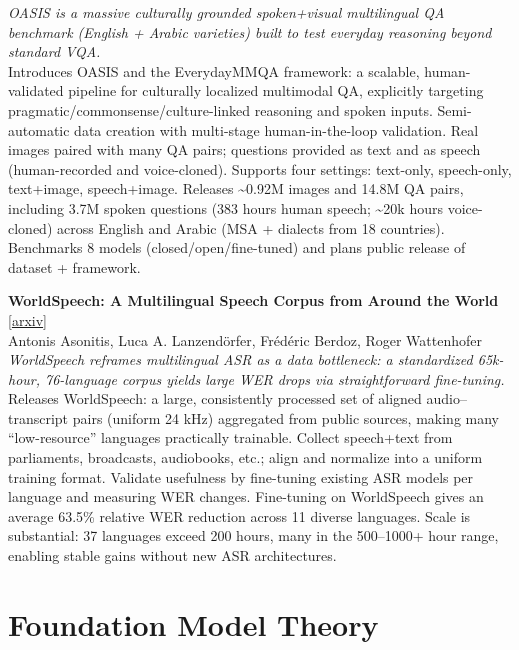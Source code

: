 \documentclass[12pt,letterpaper]{article}
\begin{document}
{\small\textit{OASIS is a massive culturally grounded spoken+visual multilingual QA benchmark (English + Arabic varieties) built to test everyday reasoning beyond standard VQA.}}\\[1pt]
{\footnotesize Introduces OASIS and the EverydayMMQA framework: a scalable, human-validated pipeline for culturally localized multimodal QA, explicitly targeting pragmatic/commonsense/culture-linked reasoning and spoken inputs. Semi-automatic data creation with multi-stage human-in-the-loop validation. Real images paired with many QA pairs; questions provided as text and as speech (human-recorded and voice-cloned). Supports four settings: text-only, speech-only, text+image, speech+image. Releases \textasciitilde{}0.92M images and 14.8M QA pairs, including 3.7M spoken questions (383 hours human speech; \textasciitilde{}20k hours voice-cloned) across English and Arabic (MSA + dialects from 18 countries). Benchmarks 8 models (closed/open/fine-tuned) and plans public release of dataset + framework.}

\medskip

{\small\textbf{WorldSpeech: A Multilingual Speech Corpus from Around the World}} {\scriptsize[\href{https://arxiv.org/abs/2605.09167}{arxiv}]}\\
{\scriptsize Antonis Asonitis, Luca A. Lanzend\"orfer, Fr\'ed\'eric Berdoz, Roger Wattenhofer}\\

{\small\textit{WorldSpeech reframes multilingual ASR as a data bottleneck: a standardized 65k-hour, 76-language corpus yields large WER drops via straightforward fine-tuning.}}\\[1pt]
{\footnotesize Releases WorldSpeech: a large, consistently processed set of aligned audio--transcript pairs (uniform 24 kHz) aggregated from public sources, making many ``low-resource'' languages practically trainable. Collect speech+text from parliaments, broadcasts, audiobooks, etc.; align and normalize into a uniform training format. Validate usefulness by fine-tuning existing ASR models per language and measuring WER changes. Fine-tuning on WorldSpeech gives an average 63.5\% relative WER reduction across 11 diverse languages. Scale is substantial: 37 languages exceed 200 hours, many in the 500--1000+ hour range, enabling stable gains without new ASR architectures.}

\medskip


\section*{Foundation Model Theory}
\end{document}
